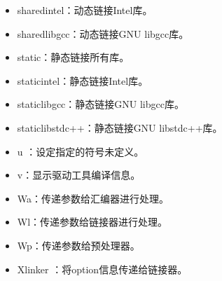 \documentclass[a4paper,12pt,english]{sphinxmanual}
\begin{document}
\begin{itemize}
\item {} 
\sphinxAtStartPar
\sphinxhyphen{}shared\sphinxhyphen{}intel：动态链接Intel库。

\item {} 
\sphinxAtStartPar
\sphinxhyphen{}shared\sphinxhyphen{}libgcc：动态链接GNU libgcc库。

\item {} 
\sphinxAtStartPar
\sphinxhyphen{}static：静态链接所有库。

\item {} 
\sphinxAtStartPar
\sphinxhyphen{}static\sphinxhyphen{}intel：静态链接Intel库。

\item {} 
\sphinxAtStartPar
\sphinxhyphen{}static\sphinxhyphen{}libgcc：静态链接GNU libgcc库。

\item {} 
\sphinxAtStartPar
\sphinxhyphen{}static\sphinxhyphen{}libstdc++：静态链接GNU libstdc++库。

\item {} 
\sphinxAtStartPar
\sphinxhyphen{}u ：设定指定的符号未定义。

\item {} 
\sphinxAtStartPar
\sphinxhyphen{}v：显示驱动工具编译信息。

\item {} 
\sphinxAtStartPar
\sphinxhyphen{}Wa：传递参数给汇编器进行处理。

\item {} 
\sphinxAtStartPar
\sphinxhyphen{}Wl：传递参数给链接器进行处理。

\item {} 
\sphinxAtStartPar
\sphinxhyphen{}Wp：传递参数给预处理器。

\item {} 
\sphinxAtStartPar
\sphinxhyphen{}Xlinker ：将option信息传递给链接器。

\end{itemize}
\end{document}
